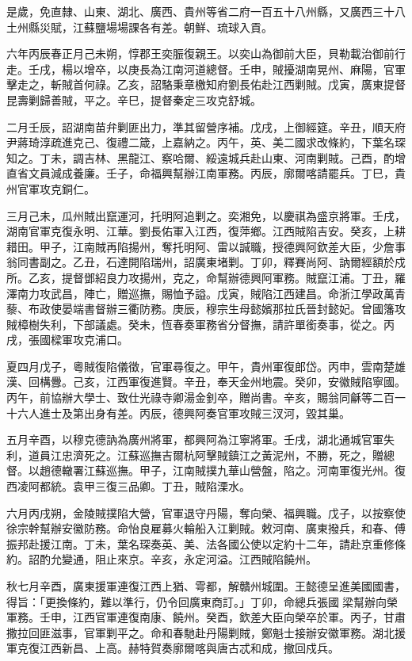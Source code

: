 \begin{pinyinscope}
是歲，免直隸、山東、湖北、廣西、貴州等省二府一百五十八州縣，又廣西三十八土州縣災賦，江蘇鹽場場課各有差。朝鮮、琉球入貢。

六年丙辰春正月己未朔，惇郡王奕脤復親王。以奕山為御前大臣，貝勒載治御前行走。壬戌，楊以增卒，以庚長為江南河道總督。壬申，賊擾湖南晃州、麻陽，官軍擊走之，斬賊首何祿。乙亥，詔駱秉章檄知府劉長佑赴江西剿賊。戊寅，廣東提督昆壽剿歸善賊，平之。辛巳，提督秦定三攻克舒城。

二月壬辰，詔湖南苗弁剿匪出力，準其留營序補。戊戌，上御經筵。辛丑，順天府尹蔣琦淳疏進克己、復禮二箴，上嘉納之。丙午，英、美二國求改條約，下葉名琛知之。丁未，調吉林、黑龍江、察哈爾、綏遠城兵赴山東、河南剿賊。己酉，酌增直省文員減成養廉。壬子，命福興幫辦江南軍務。丙辰，廓爾喀請罷兵。丁巳，貴州官軍攻克銅仁。

三月己未，瓜州賊出竄運河，托明阿追剿之。奕湘免，以慶祺為盛京將軍。壬戌，湖南官軍克復永明、江華。劉長佑軍入江西，復萍鄉。江西賊陷吉安。癸亥，上耕耤田。甲子，江南賊再陷揚州，奪托明阿、雷以諴職，授德興阿欽差大臣，少詹事翁同書副之。乙丑，石達開陷瑞州，詔廣東堵剿。丁卯，釋賽尚阿、訥爾經額於戍所。乙亥，提督鄧紹良力攻揚州，克之，命幫辦德興阿軍務。賊竄江浦。丁丑，羅澤南力攻武昌，陣亡，贈巡撫，賜恤予謚。戊寅，賊陷江西建昌。命浙江學政萬青藜、布政使晏端書督辦三衢防務。庚辰，穆宗生母懿嬪那拉氏晉封懿妃。曾國籓攻賊樟樹失利，下部議處。癸未，恆春奏軍務省分督撫，請許單銜奏事，從之。丙戌，張國樑軍攻克浦口。

夏四月戊子，粵賊復陷儀徵，官軍尋復之。甲午，貴州軍復郎岱。丙申，雲南楚雄漢、回構釁。己亥，江西軍復進賢。辛丑，奉天金州地震。癸卯，安徽賊陷寧國。丙午，前協辦大學士、致仕光祿寺卿湯金釗卒，贈尚書。辛亥，賜翁同龢等二百一十六人進士及第出身有差。丙辰，德興阿奏官軍攻賊三汊河，毀其巢。

五月辛酉，以穆克德訥為廣州將軍，都興阿為江寧將軍。壬戌，湖北通城官軍失利，道員江忠濟死之。江蘇巡撫吉爾杭阿擊賊鎮江之黃泥州，不勝，死之，贈總督。以趙德轍署江蘇巡撫。甲子，江南賊撲九華山營盤，陷之。河南軍復光州。復西凌阿都統。袁甲三復三品卿。丁丑，賊陷溧水。

六月丙戌朔，金陵賊撲陷大營，官軍退守丹陽，奪向榮、福興職。戊子，以按察使徐宗幹幫辦安徽防務。命怡良雇募火輪船入江剿賊。敕河南、廣東撥兵，和春、傅振邦赴援江南。丁未，葉名琛奏英、美、法各國公使以定約十二年，請赴京重修條約。詔酌允變通，阻止來京。辛亥，永定河溢。江西賊陷饒州。

秋七月辛酉，廣東援軍連復江西上猶、雩都，解贛州城圍。王懿德呈進美國國書，得旨：「更換條約，難以準行，仍令回廣東商訂。」丁卯，命總兵張國梁幫辦向榮軍務。壬申，江西官軍連復南康、饒州。癸酉，欽差大臣向榮卒於軍。丙子，甘肅撒拉回匪滋事，官軍剿平之。命和春馳赴丹陽剿賊，鄭魁士接辦安徽軍務。湖北援軍克復江西新昌、上高。赫特賀奏廓爾喀與唐古忒和成，撤回戍兵。


\end{pinyinscope}
